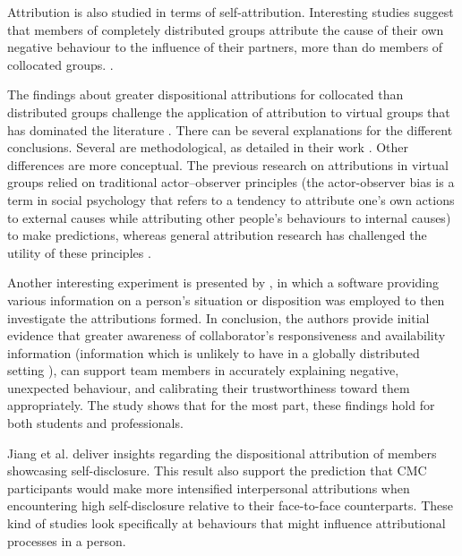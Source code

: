 Attribution is also studied in terms of self-attribution. Interesting studies suggest that members of completely distributed groups attribute the cause of their own negative behaviour to the influence of their partners, more than do members of collocated groups. \cite{Walther2007}. 

The findings about greater dispositional attributions for collocated than distributed groups challenge the application of attribution to virtual groups that has dominated the literature \cite{Cramton2001}. There can be several explanations for the different conclusions. Several are methodological, as
detailed in their work  \cite{Cramton2001}. Other differences are more conceptual.  The
previous research on attributions in virtual groups relied on traditional actor–observer principles (the actor-observer bias is a term in social psychology that refers to a tendency to attribute one's own actions to external causes while attributing other people's behaviours to internal causes) to make predictions, whereas general attribution research has challenged the utility of these principles \cite{Bazarova2009}.

Another interesting experiment is presented by \cite{Trainer2018}, in which a software providing various information on a person's situation or disposition was employed to then investigate the attributions formed.  In conclusion,  the authors provide initial evidence that greater awareness of collaborator's responsiveness and availability information (information which is unlikely to have in a globally distributed setting \cite{Cramton2001}), can support team members in accurately explaining negative, unexpected behaviour, and calibrating their trustworthiness toward them appropriately.  The study shows that for the most part, these findings hold for both students and professionals.

Jiang et al. \cite{Jiang2011} deliver insights regarding the dispositional attribution of members showcasing self-disclosure.  This result also support the prediction that CMC participants would make more intensified interpersonal attributions when encountering high self-disclosure relative to their face-to-face counterparts. These kind of studies look specifically at behaviours that might influence attributional processes in a person. 

